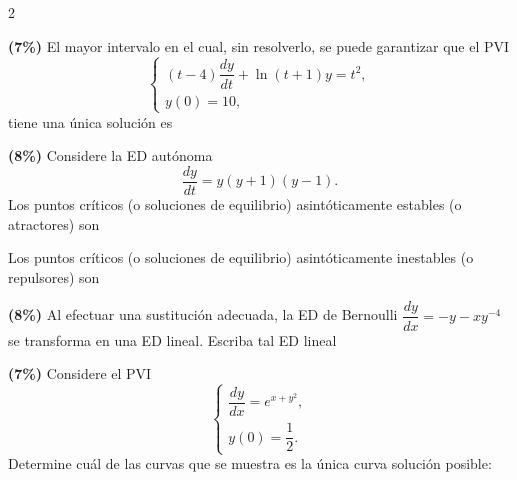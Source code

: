 \documentclass[11pt]{article}
\begin{document}
\begin{multicols}{2}

\begin{opciones}
\item[a)] \textbf{(7\%)} El mayor intervalo en el cual, sin resolverlo, se puede garantizar que el PVI
\[
\begin{cases}
(t-4)\dfrac{dy}{dt}+\ln(t+1)y=t^2, \\
y(0)=10,
\end{cases}
\]
tiene una única solución es \underline{\hspace{2.5cm}}

\item[b)] \textbf{(8\%)} Considere la ED autónoma
\[
\frac{dy}{dt}=y(y+1)(y-1).
\]
Los puntos críticos (o soluciones de equilibrio) asintóticamente estables (o atractores) son \underline{\hspace{2cm}}

Los puntos críticos (o soluciones de equilibrio) asintóticamente inestables (o repulsores) son \underline{\hspace{2cm}}

\item[c)] \textbf{(8\%)} Al efectuar una sustitución adecuada, la ED de Bernoulli $\dfrac{dy}{dx}=-y-xy^{-4}$ se transforma en una ED lineal. Escriba tal ED lineal

\underline{\hspace{5cm}}

\columnbreak

\item[d)] \textbf{(7\%)} Considere el PVI
\[
\begin{cases}
\dfrac{dy}{dx}=e^{x+y^2}, \\
y(0)=\dfrac{1}{2}.
\end{cases}
\]
Determine cuál de las curvas que se muestra es la única curva solución posible: \underline{\hspace{2.5cm}}

\begin{center}
\end{center}
\end{opciones}
\end{multicols}
\end{document}
